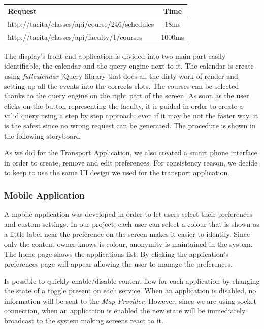 \documentclass[]{usiinfbachelorproject}
\begin{document}
\begin{table}[h]
\centering
\begin{tabular}{|l|c|}
\hline
Request & Time \\\hline
http://tacita/classes/api/course/246/schedules & 18ms \\
http://tacita/classes/api/faculty/1/courses & 1000ms\\\hline
\end{tabular}
\caption[Table caption text]{}
\label{table:classes_request}
\end{table}
The display's front end application is divided into two main part easily identifiable, the calendar and the query engine next to it. The calendar is create using \emph{fullcalendar} jQuery library that does all the dirty work of render and setting up all the events into the corrects slots. 
The courses can be selected thanks to the query engine on the right part of the screen. As soon as the user clicks on the button representing the faculty, it is guided in order to create a valid query using a step by step approach; even if it may be not the faster way, it is the safest since no wrong request can be generated. The procedure is shown in the following storyboard:

As we did for the Transport Application, we also created a smart phone interface in order to create, remove and edit preferences. For consistency reason, we decide to keep to use the same UI design we used for the transport application.
\subsubsection{Mobile Application}

A mobile application was developed in order to let users select their preferences and custom settings. In our project, each user can select a colour that is shown as a little label near the preference on the screen makes it easier to identify. Since only the content owner knows is colour, anonymity is maintained in the system. The home page shows the applications list. By clicking the application's preferences page will appear allowing the user to manage the preferences.

Is possible to quickly enable/disable content flow for each application by changing the state of a toggle present on each service. When an application is disabled, no information will be sent to the \emph{Map Provider}. However, since we are using socket connection, when an application is enabled the new state will be immediately broadcast to the system making screens react to it.
\end{document}
